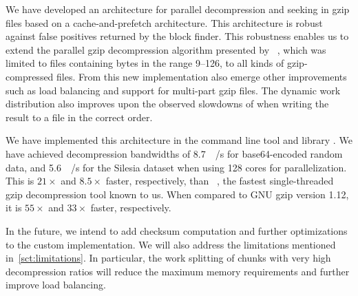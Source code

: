 
We have developed an architecture for parallel decompression and seeking in gzip files based on a cache-and-prefetch architecture.
This architecture is robust against false positives returned by the block finder.
This robustness enables us to extend the parallel gzip decompression algorithm presented by \citeauthor{pugz}~\cite{pugz}, which was limited to files containing bytes in the range 9--126, to all kinds of gzip-compressed files.
From this new implementation also emerge other improvements such as load balancing and support for multi-part gzip files.
The dynamic work distribution also improves upon the observed slowdowns of \pugz when writing the result to a file in the correct order.

We have implemented this architecture in the command line tool and library \pragzip.
We have achieved decompression bandwidths of \SI{8.7}{\giga\byte/\second} for base64-encoded random data,
  and \SI{5.6}{\giga\byte/\second} for the Silesia dataset when using 128 cores for parallelization.
This is $\num{21}\times$ and $\num{8.5}\times$ faster, respectively, than ~\cite{igzip}, the fastest single-threaded gzip decompression tool known to us.
When compared to GNU gzip version 1.12, it is $\num{55}\times$ and $\num{33}\times$ faster, respectively.

In the future, we intend to add checksum computation and further optimizations to the custom  implementation.
We will also address the limitations mentioned in~\cref{sct:limitations}.
In particular, the work splitting of chunks with very high decompression ratios will reduce the maximum memory requirements and further improve load balancing.
